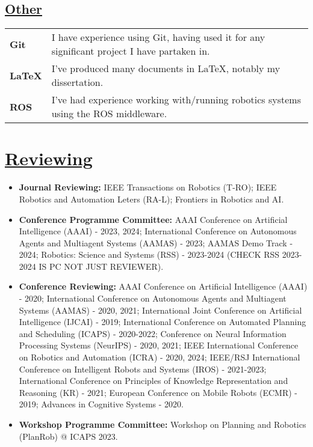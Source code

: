\documentclass[11pt]{article}
\begin{document}
		\subsection*{\underline{Other}}
		\renewcommand{\arraystretch}{1.3}%
		\begin{tabular}{ll}
			 \textbf{Git} & I have experience using Git, having used it for any significant project I have partaken in.\\
			\textbf{LaTeX} & I've produced many documents in LaTeX, notably my dissertation.\\
			\textbf{ROS} & I've had experience working with/running robotics systems using the ROS middleware.
		\end{tabular}
\fi

\section*{\underline{Reviewing}}
\begin{itemize}
\item \textbf{Journal Reviewing:} IEEE Transactions on Robotics (T-RO); IEEE Robotics and Automation Leters (RA-L); Frontiers in Robotics and AI.
\item \textbf{Conference Programme Committee:}  AAAI Conference on Artificial Intelligence (AAAI) - 2023, 2024; International Conference on Autonomous Agents and Multiagent Systems (AAMAS) - 2023; AAMAS Demo Track - 2024; Robotics: Science and Systems (RSS) - 2023-2024 (CHECK RSS 2023-2024 IS PC NOT JUST REVIEWER).
\item \textbf{Conference Reviewing:} AAAI Conference on Artificial Intelligence (AAAI) - 2020; International Conference on Autonomous Agents and Multiagent Systems (AAMAS) - 2020, 2021; International Joint Conference on Artificial Intelligence (IJCAI) - 2019; International Conference on Automated Planning and Scheduling (ICAPS) - 2020-2022; Conference on Neural Information Processing Systems (NeurIPS) - 2020, 2021; IEEE International Conference on Robotics and Automation (ICRA) - 2020, 2024; IEEE/RSJ International Conference on Intelligent Robots and Systems (IROS) - 2021-2023; International Conference on Principles of Knowledge Representation and Reasoning (KR) - 2021; European Conference on Mobile Robots (ECMR) - 2019; Advances in Cognitive Systems - 2020.
\item\textbf{Workshop Programme Committee:} Workshop on Planning and Robotics (PlanRob) @ ICAPS 2023.
\end{itemize}
\end{document}
